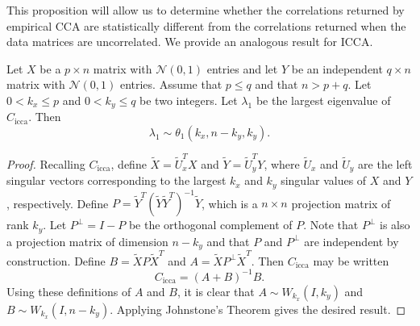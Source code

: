 This proposition will allow us to determine whether the correlations returned by empirical
CCA are statistically different from the correlations returned when the data matrices are
uncorrelated. We provide an analogous result for ICCA.

\begin{Th}\label{th:icca_sig_imag}
  Let $X$ be a $p\times n$ matrix with $\mathcal{N}(0,1)$ entries and let $Y$ be an
  independent $q\times n$ matrix with $\mathcal{N}(0,1)$ entries. Assume that $p\leq
  q$ and that $n>p+q$. Let $0<k_x\leq p$ and $0<k_y\leq q$ be two integers. Let
  $\lambda_1$ be the largest eigenvalue of $C_{\text{icca}}$. Then 
  \begin{equation}
    \lambda_1\sim \theta_1(k_x,n-k_y,k_y).
  \end{equation}
\end{Th}
\begin{proof}
  Recalling $C_{\text{icca}}$, define $\widetilde{X} = \widetilde{U}_x^TX$ and
  $\widetilde{Y}=\widetilde{U}_y^TY$, where $\widetilde{U}_x$ and $\widetilde{U}_y$ are
  the left singular vectors corresponding to the largest $k_x$ and $k_y$ singular values
  of $X$ and $Y$, respectively. Define $P =
  \widetilde{Y}^T\left(\widetilde{Y}\widetilde{Y}^T\right)^{-1}\widetilde{Y}$, which is a
  $n\times n$ projection matrix of rank $k_y$. Let $P^\perp =I-P$ be the orthogonal
  complement of $P$. Note that $P^\perp$ is also a projection matrix of dimension $n-k_y$
  and that $P$ and $P^\perp$ are independent by construction. Define
  $B=\widetilde{X}P\widetilde{X}^T$ and $A=\widetilde{X}P^\perp \widetilde{X}^T$. Then
  $C_{\text{icca}}$ may be written
  \begin{equation*}
    C_{\text{icca}} = (A+B)^{-1}B.
  \end{equation*}
  Using these definitions of $A$ and $B$, it is clear that $A\sim W_{k_x}(I,k_y)$ and $B\sim
  W_{k_x}(I,n-k_y)$. Applying Johnstone's Theorem gives the desired result.
\end{proof}

